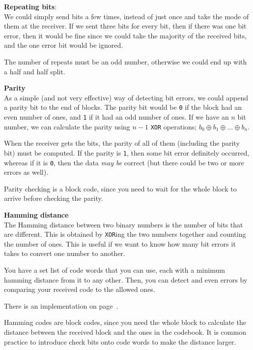 \begin{description}
  \item \textbf{Repeating bits}:\\
    We could simply send bits a few times, instead of just once and take the 
    mode of them at the receiver. If we sent three bits for every bit, then
    if there was one bit error, then it would be fine since we could take the 
    majority of the received bits, and the one error bit would be ignored.

    The number of repeats must be an odd number, otherwise we could end up with 
    a half and half split.
  \item \textbf{Parity}\\
    As a simple (and not very effective) way of detecting bit errors, we could
    append a parity bit to the end of blocks. The parity bit would be \texttt{0}
    if the block had an even number of ones, and \texttt{1} if it had an odd
    number of ones. If we have an $n$ bit number, we can calculate the parity
    using $n - 1$ \texttt{XOR} operations; $b_0 \oplus b_1 \oplus \dots \oplus
    b_n$.

    When the receiver gets the bits, the parity of all of them (including the
    parity bit) must be computed. If the parity is \texttt{1}, then some bit
    error definitely occurred, whereas if it is \texttt{0}, then the data
    \textit{may be} correct (but there could be two or more errors as well).

    Parity checking is a block code, since you need to wait for the whole block
    to arrive before checking the parity.
  \item \textbf{Hamming distance}\\
    The Hamming distance between two binary numbers is the number of bits that
    are different. This is obtained by \texttt{XOR}ing the two numbers together
    and counting the number of ones. This is useful if we want to know how many
    bit errors it takes to convert one number to another.

    You have a set list of code words that you can use, each with a minimum
    hamming distance from it to any other. Then, you can detect and even errors
    by comparing your received code to the allowed ones.

    There is an implementation on page~\pageref{HammingCodes}.

    Hamming codes are block codes, since you need the whole block to calculate
    the distance between the received block and the ones in the codebook. It is
    common practice to introduce check bits onto code words to make the distance
    larger.


\end{description}
